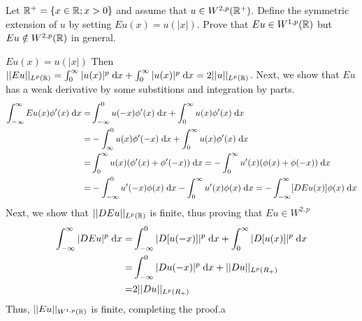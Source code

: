 Let $\mathbb{R}^+ = \{ x \in \mathbb{R}; x > 0 \}$ and assume that $u \in W^{2, p}(\mathbb{R}^+)$.
Define the symmetric extension of $u$ by setting $E u(x) = u(|x|)$.
Prove that $E u \in W^{1, p}(\mathbb{R})$ but $E u \notin W^{2, p}(\mathbb{R})$ in general.

$E u(x) = u(|x|)$
Then $||E u||_{L^p(\mathbb{R})} = \int_0^\infty |u(x)|^p \;\mathrm{d}x + \int_0^\infty |u(x)|^p \;\mathrm{d}x = 2 ||u||_{L^p(\mathbb{R})}$.
Next, we show that $E u$ has a weak derivative by some substitions and integration by parts.
\begin{align*}
  \int_{-\infty}^{\infty} E u(x) \phi'(x) \;\mathrm{d}x = &\int_{-\infty}^{0} u(-x) \phi'(x) \;\mathrm{d}x + \int_{0}^{\infty} u(x) \phi'(x) \;\mathrm{d}x\\
                                           = &-\int_{\infty}^{0} u(x) \phi'(-x) \;\mathrm{d}x + \int_{0}^{\infty} u(x) \phi'(x) \;\mathrm{d}x\\
                                           = &\int_{0}^{\infty} u(x) (\phi'(x) + \phi'(-x)) \;\mathrm{d}x
                                           =  -\int_{0}^{\infty} u'(x) (\phi(x) + \phi(-x)) \;\mathrm{d}x\\
                                           = &-\int_{-\infty}^{0} u'(-x) \phi(x) \;\mathrm{d}x
                                              -\int_{0}^{\infty} u'(x) \phi(x) \;\mathrm{d}x
                                           = -\int_{-\infty}^{\infty} [D E u(x)] \phi(x) \;\mathrm{d}x
\end{align*}
Next, we show that $||D E u||_{L^p(\mathbb{R})}$ is finite, thus proving that $E u \in W^{2, p}$
\begin{align*}
  \int_{-\infty}^{\infty} |D E u|^p \;\mathrm{d}x = &\int_{-\infty}^0 |D [u(-x)]|^p \;\mathrm{d}x + \int_{0}^\infty |D [u(x)]|^p \;\mathrm{d}x\\
                                     = &\int_{-\infty}^0 |D u(-x)|^p \;\mathrm{d}x + ||D u||_{L^p(R_+)}\\
                                     = &2 ||D u||_{L^p(R_+)}
\end{align*}
Thus, $||E u||_{W^{1, p}(\mathbb{R})}$ is finite, completing the proof.a

